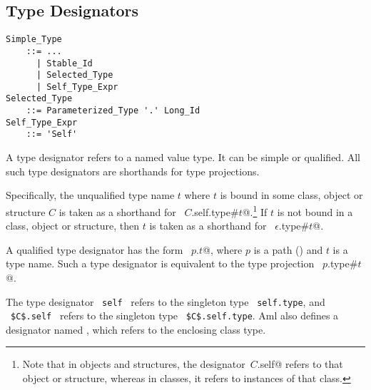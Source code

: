 \subsection{Type Designators}
\label{sec:type-designators}

\grammar\begin{lstlisting}
Simple_Type 
    ::= ...
      | Stable_Id
      | Selected_Type
      | Self_Type_Expr
Selected_Type
    ::= Parameterized_Type '.' Long_Id
Self_Type_Expr
    ::= 'Self'
\end{lstlisting}

A type designator refers to a named value type. It can be simple or qualified. All such type designators are shorthands for type projections. 

Specifically, the unqualified type name $t$ where $t$ is bound in some class, object or structure $C$ is taken as a shorthand for ~\lstinline@$C$.self.type#$t$@.\footnote{Note that in objects and structures, the designator~\lstinline@$C$.self@ refers to that object or structure, whereas in classes, it refers to instances of that class.} If $t$ is not bound in a class, object or structure, then $t$ is taken as a shorthand for ~\lstinline@$\epsilon$.type#$t$@. 

A qualified type designator has the form ~\lstinline@$p$.$t$@, where $p$ is a path () and $t$ is a type name. Such a type designator is equivalent to the type projection ~\lstinline@$p$.type#$t$@. 

The type designator ~\lstinline!self!~ refers to the singleton type ~\lstinline!self.type!, and ~\lstinline!$C$.self!~ refers to the singleton type ~\lstinline!$C$.self.type!. Aml also defines a designator named , which refers to the enclosing class type. 


